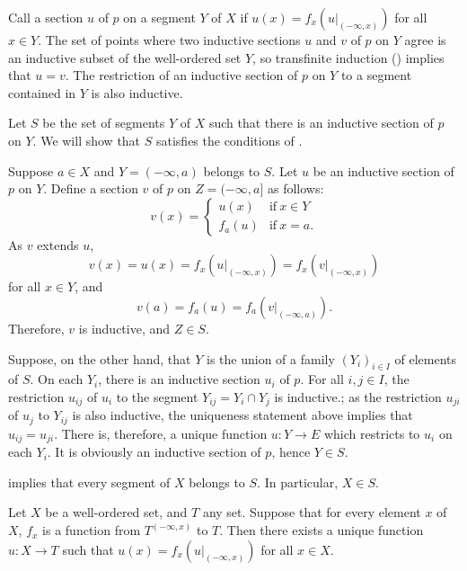 \documentclass{article}
\begin{document}
Call a section \(u\) of \(p\) on a segment \(Y\) of \(X\)
 if \(u(x) = f_x(u \vert_{(-\infty, x)})\) for
all \(x \in Y\).  The set of points where two inductive sections \(u\)
and \(v\) of \(p\) on \(Y\) agree is an inductive subset of the
well-ordered set \(Y\), so transfinite induction ()
implies that \(u = v\).  The restriction of an inductive section of
\(p\) on \(Y\) to a segment contained in \(Y\) is also inductive.

Let \(S\) be the set of segments \(Y\) of \(X\) such that there is an
inductive section of \(p\) on \(Y\).  We will show that \(S\)
satisfies the conditions of .

Suppose \(a \in X\) and \(Y = (-\infty, a)\) belongs to \(S\).  Let
\(u\) be an inductive section of \(p\) on \(Y\).  Define a section
\(v\) of \(p\) on \(Z = (-\infty, a]\) as follows:
\begin{displaymath}
  v(x) =
  \begin{cases}
    u(x) & \text{if} ~ x \in Y \\
    f_a(u) & \text{if} ~ x = a.
  \end{cases}
\end{displaymath}
As \(v\) extends \(u\),
\begin{displaymath}
  v(x) = u(x) = f_x(u \vert_{(-\infty, x)}) =
  f_x(v \vert_{(-\infty, x)})
\end{displaymath}
for all \(x \in Y\), and
\begin{displaymath}
  v(a) = f_a(u) = f_a(v \vert_{(-\infty, a)}).
\end{displaymath}
Therefore, \(v\) is inductive, and \(Z \in S\).

Suppose, on the other hand, that \(Y\) is the union of a family
\((Y_i)_{i \in I}\) of elements of \(S\).  On each \(Y_i\), there is
an inductive section \(u_i\) of \(p\).  For all \(i, j \in I\), the
restriction \(u_{ij}\) of \(u_i\) to the segment
\(Y_{ij} = Y_i \cap Y_j\) is inductive.; as the restriction \(u_{ji}\)
of \(u_j\) to \(Y_{ij}\) is also inductive, the uniqueness statement
above implies that \(u_{ij} = u_{ji}\).  There is, therefore, a unique
function \(u : Y \to E\) which restricts to \(u_i\) on each \(Y_i\).
It is obviously an inductive section of \(p\), hence \(Y \in S\).

 implies that every segment of \(X\) belongs to
\(S\).  In particular, \(X \in S\).

\begin{theorem}
  \label{thm:5kg5ewo1}
  Let \(X\) be a well-ordered set, and \(T\) any set.  Suppose that
  for every element \(x\) of \(X\), \(f_x\) is a function from
  \(T^{(-\infty, x)}\) to \(T\).  Then there exists a unique function
  \(u : X \to T\) such that \(u(x) = f_x(u \vert_{(-\infty, x)})\) for
  all \(x \in X\).
\end{theorem}
\end{document}
